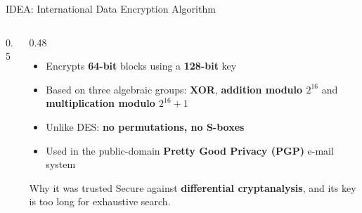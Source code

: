 \documentclass[aspectratio=169,11pt,xcolor={table}]{beamer}
\begin{document}
\begin{frame}{IDEA: International Data Encryption Algorithm}
  \begin{columns}[c]
    \begin{column}{0.5\textwidth}
      \centering
    \end{column}
    \begin{column}{0.48\textwidth}
      \begin{itemize}\small\setlength{\itemsep}{3pt}
        \item Encrypts \textbf{64-bit} blocks using a \textbf{128-bit} key
        \item Based on three algebraic groups: \textbf{XOR}, \textbf{addition modulo $2^{16}$} and \textbf{multiplication modulo $2^{16}+1$}
        \item Unlike DES: \textbf{no permutations, no S-boxes}
        \item Used in the public-domain \textbf{Pretty Good Privacy (PGP)} e-mail system
      \end{itemize}
      \begin{exampleblock}{Why it was trusted}
        \small Secure against \textbf{differential cryptanalysis}, and its key is too long for exhaustive search.
      \end{exampleblock}
    \end{column}
  \end{columns}
\end{frame}
\end{document}
